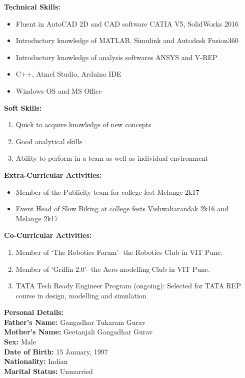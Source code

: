 \documentclass{article}
\begin{document}
\begin{flushleft}
		\medskip
		\textbf{Technical Skills:} 
		\begin{itemize}
			\item Fluent in AutoCAD 2D and CAD software CATIA V5, SolidWorks 2016
			\item Introductory knowledge of MATLAB, Simulink and Autodesk Fusion360
			\item Introductory knowledge of analysis softwares ANSYS and V-REP
			\item C++, Atmel Studio, Arduino IDE
			\item Windows OS and MS Office
		\end{itemize}
		
		\pagebreak
		\textbf{Soft Skills:} 
		\begin{enumerate}
			\item Quick to acquire knowledge of new concepts
			\item Good analytical skills
			\item Ability to perform in a team as well as individual environment
		\end{enumerate}
	
		\medskip
		\textbf{Extra-Curricular Activities:} 
		\begin{itemize}
			\item Member of the Publicity team for college fest Melange 2k17
			\item Event Head of Slow Biking at college fests Vishwakarandak 2k16 and Melange 2k17
		\end{itemize}
	
		\medskip
		\textbf{Co-Curricular Activities:} 
		\begin{enumerate}
			\item Member of ‘The Robotics Forum’- the Robotics Club in VIT Pune.
			\item Member of ‘Griffin 2.0’- the Aero-modelling Club in VIT Pune.
			\item TATA Tech Ready Engineer Program (ongoing): Selected for TATA REP course in design, modelling and simulation
		\end{enumerate}
	
		\medskip
		\textbf{Personal Details:}\\
		\medskip
		\textbf{Father's Name:} Gangadhar Tukaram Gurav\\
		\textbf{Mother's Name:} Geetanjali Gangadhar Gurav\\
		\textbf{Sex:} Male\\
		\textbf{Date of Birth:} 15 January, 1997\\
		\textbf{Nationality:} Indian\\
		\textbf{Marital Status:} Unmarried\\
			
\end{flushleft}
\end{document}
